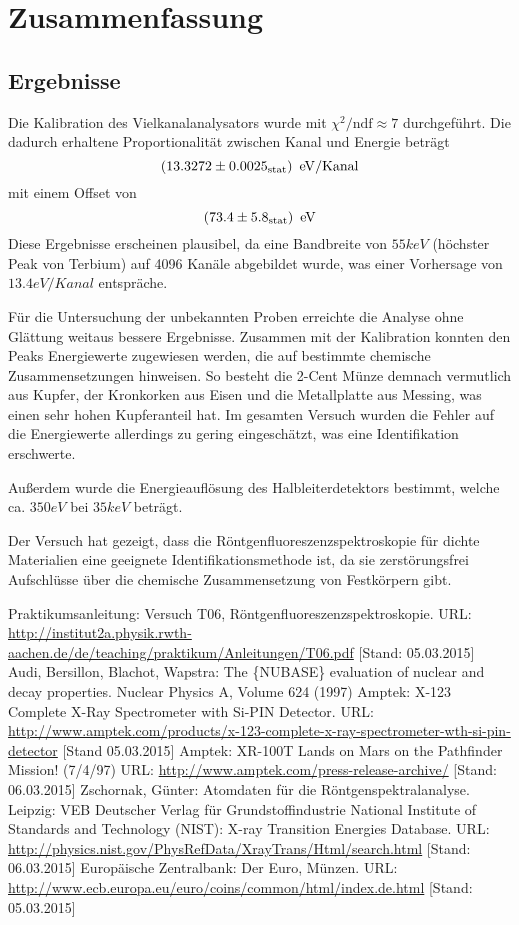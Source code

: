 \documentclass{../Misc/MontavonLaTeX/Montavon}
\begin{document}
\section{Zusammenfassung}
\subsection{Ergebnisse}
Die Kalibration des Vielkanalanalysators wurde mit $\chi^2 / \textrm{ndf} \approx 7$ durchgeführt. Die dadurch erhaltene Proportionalität zwischen Kanal und Energie beträgt \[ (13.3272 \pm 0.0025_\textrm{stat}) \enskip \mathrm{eV / Kanal} \]mit einem Offset von \[ (73.4 \pm 5.8_\textrm{stat}) \enskip \mathrm{eV} \]
Diese Ergebnisse erscheinen plausibel, da eine Bandbreite von $55 \unit{keV}$ (höchster Peak von Terbium) auf 4096 Kanäle abgebildet wurde, was einer Vorhersage von $13.4 \unit{eV / Kanal}$ entspräche.

Für die Untersuchung der unbekannten Proben erreichte  die Analyse ohne Glättung weitaus bessere Ergebnisse.
Zusammen mit der Kalibration konnten den Peaks Energiewerte zugewiesen werden, die auf bestimmte chemische Zusammensetzungen hinweisen. So besteht die 2-Cent Münze demnach vermutlich aus Kupfer, der Kronkorken aus Eisen und die Metallplatte aus Messing, was einen sehr hohen Kupferanteil hat. Im gesamten Versuch wurden die Fehler auf die Energiewerte allerdings zu gering eingeschätzt, was eine Identifikation erschwerte.

Außerdem wurde die Energieauflösung des Halbleiterdetektors bestimmt, welche ca. $350 \unit{eV}$ bei $35 \unit{keV}$ beträgt.

Der Versuch hat gezeigt, dass die Röntgenfluoreszenzspektroskopie für dichte Materialien eine geeignete Identifikationsmethode ist, da sie zerstörungsfrei Aufschlüsse über die chemische Zusammensetzung von Festkörpern gibt.

\newpage
\begin{thebibliography}{xxxx}
 Praktikumsanleitung: Versuch T06, Röntgenfluoreszenzspektroskopie. URL: \url{http://institut2a.physik.rwth-aachen.de/de/teaching/praktikum/Anleitungen/T06.pdf} [Stand: 05.03.2015]
 Audi, Bersillon, Blachot, Wapstra: The \{NUBASE\} evaluation of nuclear and decay properties. Nuclear Physics A, Volume 624 (1997)
 Amptek: X-123 Complete X-Ray Spectrometer with Si-PIN Detector. URL: \url{http://www.amptek.com/products/x-123-complete-x-ray-spectrometer-wth-si-pin-detector} [Stand 05.03.2015]
 Amptek: XR-100T Lands on Mars on the Pathfinder Mission! (7/4/97) URL: \url{http://www.amptek.com/press-release-archive/} [Stand: 06.03.2015]
 Zschornak, Günter: Atomdaten für die Röntgenspektralanalyse. Leipzig: VEB Deutscher Verlag für Grundstoffindustrie
 National Institute of Standards and Technology (NIST): X-ray Transition Energies Database. URL: \url{http://physics.nist.gov/PhysRefData/XrayTrans/Html/search.html} [Stand: 06.03.2015]
 Europäische Zentralbank: Der Euro, Münzen. URL: \url{http://www.ecb.europa.eu/euro/coins/common/html/index.de.html} [Stand: 05.03.2015]
\end{thebibliography}
\end{document}
